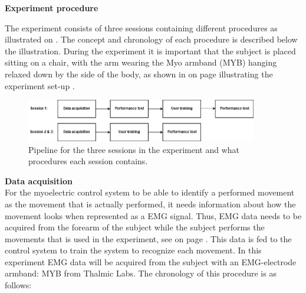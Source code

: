 \textbf{\Large{Experiment procedure}}

The experiment consists of three sessions containing different procedures as illustrated on . The concept and chronology of each procedure is described below the illustration. During the experiment it is important that the subject is placed sitting on a chair, with the arm wearing the Myo armband (MYB) hanging relaxed down by the side of the body, as shown in  on page \pageref{fig:experiment_setup} illustrating the experiment set-up . 

\begin{figure}[H]                                         
	\includegraphics[width=0.9\textwidth]{figures/pMethods/experiment_protocol_pipeline}  
	\caption{Pipeline for the three sessions in the experiment and what procedures each session contains.}
	\label{fig:experiment_protocol_pipeline} 
\end{figure}


\textbf{Data acquisition} \\
For the myoelectric control system to be able to identify a performed movement as the movement that is actually performed, it needs information about how the movement looks when represented as a EMG signal. Thus, EMG data needs to be acquired from the forearm of the subject while the subject performs the movements that is used in the experiment, see  on page \pageref{fig:experiment_movements}. This data is fed to the control system to train the system to recognize each movement. In this experiment EMG data will be acquired from the subject with an EMG-electrode armband: MYB from Thalmic Labs. The chronology of this procedure is as follows:

